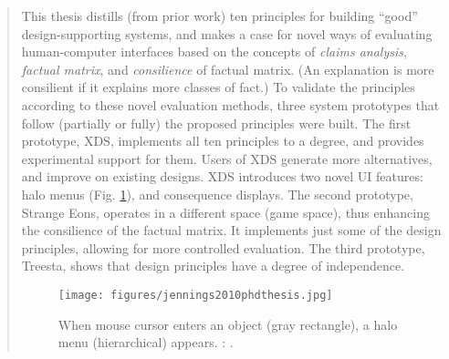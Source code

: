 		\begin{quote}
		\small
		This thesis distills (from prior work) 
		ten principles for building ``good'' design-supporting systems,
		and makes a case for novel ways of evaluating human-computer interfaces based on 
		the concepts of {\em claims analysis}, {\em factual matrix}, and 
		{\em consilience} of factual matrix. (An explanation is more consilient if
		it explains more classes of fact.) To validate the principles
		according to these novel evaluation methods, 
		three system prototypes that follow (partially or fully) the proposed principles were built.
		The first prototype, XDS, implements all ten principles to a degree, and provides
		experimental support for them. Users of XDS generate more alternatives,
		and improve on existing designs. XDS introduces two novel UI features:
		halo menus (Fig. \ref{fig:jennings2010phdthesis}), and consequence displays.
		The second prototype, Strange Eons, operates in a different space (game space),
		thus enhancing the consilience of the factual matrix. It implements just some
		of the design principles, allowing for more controlled evaluation.
		The third prototype, Treesta, shows that design principles have a degree of independence.
		
		\begin{figure}[htb]
		\begin{center}
		\texttt{[image: figures/jennings2010phdthesis.jpg]}
		\caption{
		When mouse cursor enters an object (gray rectangle), 
		a halo menu (hierarchical) appears.  
		\citeauthor{jennings2010phdthesis}: 
		\cite{jennings2010phdthesis}.}
		\label{fig:jennings2010phdthesis}
		\end{center}
		\end{figure}
		\end{quote}
		

